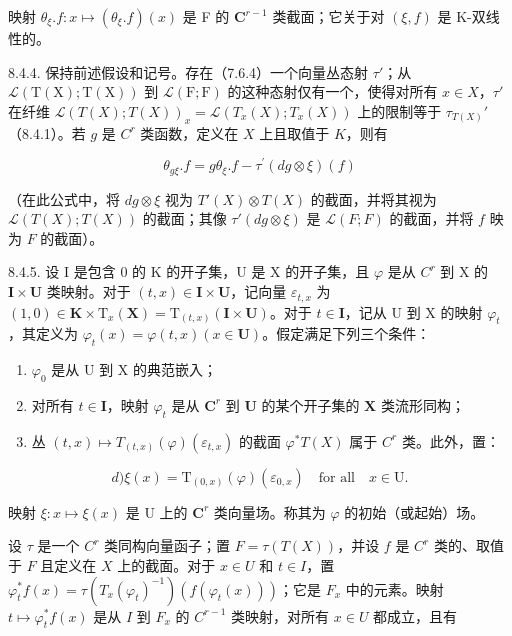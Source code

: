 映射 \(\theta_{\xi}.f: x \mapsto (\theta_{\xi}.f)(x)\) 是 F 的 \(\mathbf{C}^{r-1}\) 类截面；它关于对 \((\xi, f)\) 是 K-双线性的。

8.4.4. 保持前述假设和记号。存在（7.6.4）一个向量丛态射 \(\tau'\)；从 \(\mathcal{L}(\mathrm{T}(\mathrm{X});\mathrm{T}(\mathrm{X}))\) 到 \(\mathcal{L}(\mathrm{F};\mathrm{F})\) 的这种态射仅有一个，使得对所有 \(x \in X\)，\(\tau'\) 在纤维 \(\mathcal{L}(T(X); T(X))_x = \mathcal{L}(T_x(X); T_x(X))\) 上的限制等于 \(\tau_{T(X)}'\)（8.4.1）。若 \(g\) 是 \(C^r\) 类函数，定义在 \(X\) 上且取值于 \(K\)，则有

\[
\theta_ {g \xi}. f = g \theta_ {\xi}. f - \tau^ {\prime} (d g \otimes \xi) (f)
\]

（在此公式中，将 \(dg \otimes \xi\) 视为 \(T'(X) \otimes T(X)\) 的截面，并将其视为 \(\mathcal{L}(T(X); T(X))\) 的截面；其像 \(\tau'(dg \otimes \xi)\) 是 \(\mathcal{L}(F; F)\) 的截面，并将 \(f\) 映为 \(F\) 的截面）。

8.4.5. 设 I 是包含 0 的 K 的开子集，U 是 X 的开子集，且 \(\varphi\) 是从 \(C^r\) 到 X 的 \(\mathbf{I} \times \mathbf{U}\) 类映射。对于 \((t, x) \in \mathbf{I} \times \mathbf{U}\)，记向量 \(\varepsilon_{t,x}\) 为 \((1, 0) \in \mathbf{K} \times \mathrm{T}_x(\mathbf{X}) = \mathrm{T}_{(t,x)}(\mathbf{I} \times \mathbf{U})\)。对于 \(t \in \mathbf{I}\)，记从 U 到 X 的映射 \(\varphi_t\)，其定义为 \(\varphi_t(x) = \varphi(t, x) (x \in \mathbf{U})\)。假定满足下列三个条件：

\begin{enumerate}
\def\labelenumi{\alph{enumi})}
\item
  \(\varphi_{0}\) 是从 U 到 X 的典范嵌入；
\item
  对所有 \(t \in \mathbf{I}\)，映射 \(\varphi_t\) 是从 \(\mathbf{C}^r\) 到 \(\mathbf{U}\) 的某个开子集的 \(\mathbf{X}\) 类流形同构；
\item
  丛 \((t, x) \mapsto T_{(t, x)}(\varphi)(\varepsilon_{t,x})\) 的截面 \(\varphi^*T(X)\) 属于 \(C^r\) 类。此外，置：
\end{enumerate}

\[
d) \xi (x) = \mathrm{T} _ {(0, x)} (\varphi) (\varepsilon_ {0, x}) \quad \text {for all} \quad x \in \mathrm{U}.
\]

映射 \(\xi\colon x\mapsto\xi(x)\) 是 U 上的 \(\mathbf{C}^{r}\) 类向量场。称其为 \(\varphi\) 的初始（或起始）场。

设 \(\tau\) 是一个 \(C^r\) 类同构向量函子；置 \(F = \tau(T(X))\)，并设 \(f\) 是 \(C^r\) 类的、取值于 \(F\) 且定义在 \(X\) 上的截面。对于 \(x \in U\) 和 \(t \in I\)，置 \(\varphi_t^* f(x) = \tau(T_x(\varphi_t)^{-1})(f(\varphi_t(x)))\)；它是 \(F_x\) 中的元素。映射 \(t \mapsto \varphi_t^* f(x)\) 是从 \(I\) 到 \(F_x\) 的 \(C^{r-1}\) 类映射，对所有 \(x \in U\) 都成立，且有


